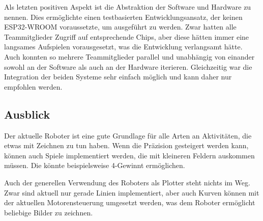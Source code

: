 \documentclass[conference,compsoc,final,a4paper]{IEEEtran}
\begin{document}
Als letzten positiven Aspekt ist die Abstraktion der Software und Hardware zu nennen. Dies ermöglichte einen testbasierten
Entwicklungsansatz, der keinen ESP32-WROOM voraussetzte, um ausgeführt zu werden. Zwar hatten alle Teammitglieder Zugriff auf entsprechende
Chips, aber diese hätten immer eine langsames Aufspielen vorausgesetzt, was die Entwicklung verlangsamt hätte. Auch konnten so mehrere
Teammitglieder parallel und unabhängig von einander sowohl an der Software als auch an der Hardware iterieren. Gleichzeitig war die
Integration der beiden Systeme sehr einfach möglich und kann daher nur empfohlen werden.

\subsection{Ausblick}

Der aktuelle Roboter ist eine gute Grundlage für alle Arten an Aktivitäten, die etwas mit Zeichnen zu tun haben. Wenn die Präzision
gesteigert werden kann, können auch Spiele implementiert werden, die mit kleineren Feldern auskommen müssen. Die könnte beispielsweise
4-Gewinnt ermöglichen.

Auch der generellen Verwendung des Roboters als Plotter steht nichts im Weg. Zwar sind aktuell nur gerade Linien implementiert, aber
auch Kurven können mit der aktuellen Motorensteuerung umgesetzt werden, was dem Roboter ermöglicht beliebige Bilder zu zeichnen.

\printbibliography
\end{document}
